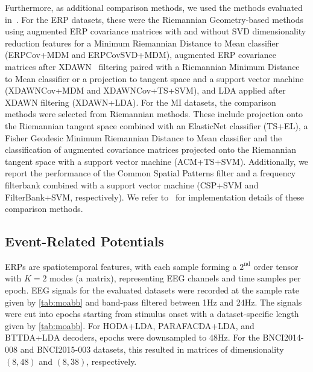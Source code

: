 Furthermore, as additional comparison methods, we used the methods evaluated in~\cite{Chevallier2024}.
For the ERP datasets, these were the Riemannian Geometry-based methods
using augmented ERP covariance matrices with and without SVD dimensionality
reduction features for a Minimum Riemannian Distance to Mean classifier
(ERPCov+MDM and ERPCovSVD+MDM), augmented ERP covariance matrices after
XDAWN~\cite{Rivet2009}
filtering paired with a Riemannian Minimum Distance to Mean classifier or a
projection to tangent space and a support vector machine
(XDAWNCov+MDM and XDAWNCov+TS+SVM), and LDA applied after XDAWN filtering
(XDAWN+LDA).
For the MI datasets, the comparison methods were selected from Riemannian
methods.
These include projection onto the Riemannian tangent space combined with an
ElasticNet classifier (TS+EL), a Fisher Geodesic Minimum Riemannian Distance to
Mean classifier and the classification of augmented covariance matrices
projected onto the Riemannian tangent space with a support vector machine
(ACM+TS+SVM).
Additionally, we report the performance of the Common Spatial Patterns filter
and a frequency filterbank combined with a support vector machine (CSP+SVM and
FilterBank+SVM, respectively).
We refer to~\cite{Chevallier2024} for implementation details of these comparison
methods.

\subsection{Event-Related Potentials}
ERPs are spatiotemporal features, with each sample forming a $2^\text{nd}$
order tensor with $K=2$ modes (a matrix), representing EEG channels and time samples
per epoch.
EEG signals for the evaluated datasets were recorded at the sample rate given
by \cref{tab:moabb} and band-pass filtered between 1Hz
and 24Hz.
The signals were cut into epochs starting from stimulus onset with a
dataset-specific length given by \cref{tab:moabb}.
For HODA+LDA, PARAFACDA+LDA, and BTTDA+LDA decoders, epochs were downsampled to 48Hz.
For the BNCI2014-008 and BNCI2015-003 datasets, this resulted in matrices of
dimensionality $(8,48)$ and $(8,38)$, respectively.

